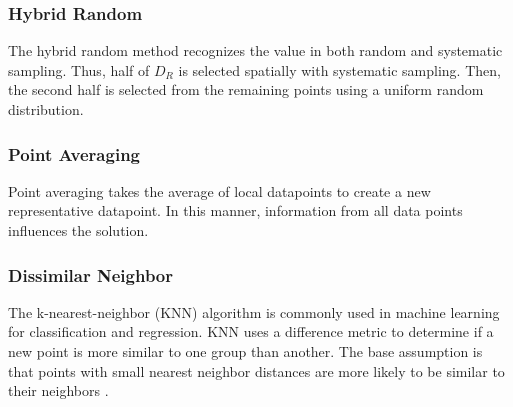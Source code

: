\subsubsection{Hybrid Random}

The hybrid random method recognizes the value in both random and systematic sampling. Thus, half of  $D_R$ is selected spatially with systematic sampling. Then, the second half is selected from the remaining points using a uniform random distribution.

\subsubsection{Point Averaging}

Point averaging takes the average of local datapoints to create a new representative datapoint. In this manner, information from all data points influences the solution. 



\subsubsection{Dissimilar Neighbor}

The k-nearest-neighbor (KNN) algorithm is commonly used in machine learning for classification and regression. KNN uses a difference metric to determine if a new point is more similar to one group than another. The base assumption is that points with small nearest neighbor distances are more likely to be similar to their neighbors \cite{anderberg2014kmeans}. 

